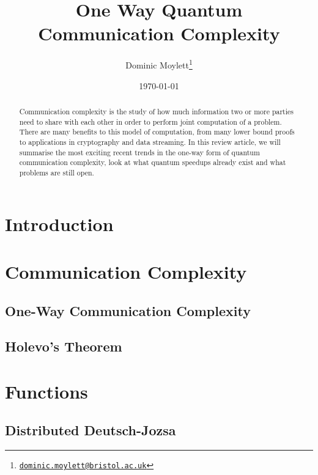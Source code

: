 \documentclass[a4paper]{article}
\begin{document}
    \title{One Way Quantum Communication Complexity}
    \author{Dominic Moylett\thanks{\texttt{\href{dominic.moylett@bristol.ac.uk}{dominic.moylett@bristol.ac.uk}}}}
    \date{\today}
    \maketitle

    \begin{abstract}
        Communication complexity is the study of how much information two or more parties need to share with each other in order to perform joint computation of a problem. There are many benefits to this model of computation, from many lower bound proofs to applications in cryptography and data streaming. In this review article, we will summarise the most exciting recent trends in the one-way form of quantum communication complexity, look at what quantum speedups already exist and what problems are still open.
    \end{abstract}

    \section{Introduction}

    \section{Communication Complexity}

        \subsection{One-Way Communication Complexity}

        \subsection{Holevo's Theorem}

    \section{Functions}

        \subsection{Distributed Deutsch-Jozsa}
\end{document}
